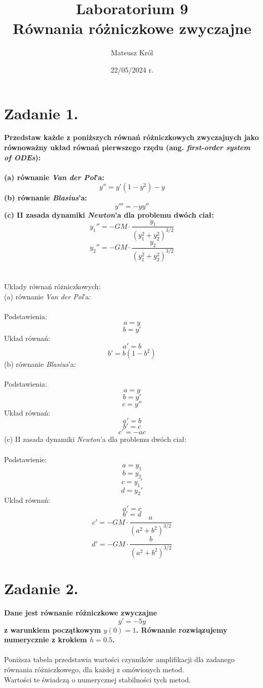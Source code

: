 \documentclass{article}
\title{%
Laboratorium 9\\
  \huge Równania różniczkowe zwyczajne}
\author{Mateusz Król}
\date{22/05/2024 r.}
\begin{document}
\maketitle

 
\section*{Zadanie 1.}
\textbf{Przedstaw każde z poniższych równań różniczkowych zwyczajnych
jako równoważny układ równań pierwszego rzędu (ang. \textit{first-order system of ODEs}):\\\\
(a) równanie \textit{Van der Pol}'a:
$$y'' = y'(1-y^2) - y$$
(b) równanie \textit{Blasius}'a:
$$y''' = -yy''$$
(c) II zasada dynamiki \textit{Newton}'a dla problemu dwóch ciał:
$$y_1'' = -GM\cdot \frac{y_1}{(y_1^2+y_2^2)^{3/2}}$$
$$y_2'' = -GM\cdot \frac{y_2}{(y_1^2+y_2^2)^{3/2}}$$
}\\\\

Układy równań różniczkowych:\\
(a) równanie \textit{Van der Pol}'a:\\\\
Podstawienia:
    $$a=y$$
    $$b=y'$$
Układ równań:
    $$a'=b$$
    $$b'=b(1-b^2)$$
(b) równanie \textit{Blasius}'a:\\\\
Podstawienia:
    $$a=y$$
    $$b=y'$$
    $$c=y''$$
Układ równań:
    $$a'=b$$
    $$b'=c$$
    $$c'=-ac$$
(c) II zasada dynamiki \textit{Newton}'a dla problemu dwóch ciał:\\\\
Podstawienie:
    $$a=y_1$$
    $$b=y_2$$
    $$c=y_1'$$
    $$d=y_2'$$
Układ równań:
    $$a'=c$$
    $$b'=d$$
    $$c'=-GM\cdot \frac{a}{(a^2+b^2)^{3/2}}$$
    $$d'=-GM\cdot \frac{b}{(a^2+b^2)^{3/2}}$$

\section*{Zadanie 2.}
\textbf{Dane jest równanie różniczkowe zwyczajne
$$y'=-5y$$
z warunkiem początkowym $y(0) = 1$. Równanie rozwiązujemy numerycznie z
krokiem $h = 0.5$.
}\\\\

Poniższa tabela przedstawia wartości czynników amplifikacji dla zadanego
równania różniczkowego, dla każdej z omówionych metod.\\
Wartości te świadczą o numerycznej stabilności tych metod.
\end{document}
